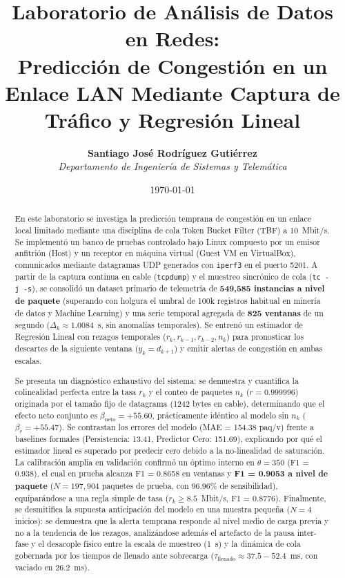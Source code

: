 \documentclass[11pt,a4paper]{article}
\title{\textbf{Laboratorio de Análisis de Datos en Redes: \\ Predicción de Congestión en un Enlace LAN Mediante Captura de Tráfico y Regresión Lineal}}
\author{\textbf{Santiago José Rodríguez Gutiérrez} \\ \textit{Departamento de Ingeniería de Sistemas y Telemática}}
\date{\today}
\begin{document}
\maketitle

\begin{abstract}
En este laboratorio se investiga la predicción temprana de congestión en un enlace local limitado mediante una disciplina de cola Token Bucket Filter (TBF) a 10~Mbit/s. Se implementó un banco de pruebas controlado bajo Linux compuesto por un emisor anfitrión (Host) y un receptor en máquina virtual (Guest VM en VirtualBox), comunicados mediante datagramas UDP generados con \texttt{iperf3} en el puerto 5201. A partir de la captura continua en cable (\texttt{tcpdump}) y el muestreo sincrónico de cola (\texttt{tc -j -s}), se consolidó un dataset primario de telemetría de \textbf{549,585 instancias a nivel de paquete} (superando con holgura el umbral de 100k registros habitual en minería de datos y Machine Learning) y una serie temporal agregada de \textbf{825 ventanas} de un segundo ($\Delta_k \approx 1.0084$~s, sin anomalías temporales). Se entrenó un estimador de Regresión Lineal con rezagos temporales ($r_k, r_{k-1}, r_{k-2}, n_k$) para pronosticar los descartes de la siguiente ventana ($y_k = d_{k+1}$) y emitir alertas de congestión en ambas escalas.

Se presenta un diagnóstico exhaustivo del sistema: se demuestra y cuantifica la colinealidad perfecta entre la tasa $r_k$ y el conteo de paquetes $n_k$ ($r = 0.999996$) originada por el tamaño fijo de datagrama (1242 bytes en cable), determinando que el efecto neto conjunto es $\beta_{\text{neto}} = +55.60$, prácticamente idéntico al modelo sin $n_k$ ($\beta_r = +55.47$). Se contrastan los errores del modelo (MAE = 154.38 paq/v) frente a baselines formales (Persistencia: 13.41, Predictor Cero: 151.69), explicando por qué el estimador lineal es superado por predecir cero debido a la no-linealidad de saturación. La calibración amplia en validación confirmó un óptimo interno en $\theta = 350$ (F1 = 0.938), el cual en prueba alcanza F1 = 0.8658 en ventanas y \textbf{F1 = 0.9053 a nivel de paquete} ($N = 197,904$ paquetes de prueba, con 96.96\% de sensibilidad), equiparándose a una regla simple de tasa ($r_k \ge 8.5$~Mbit/s, F1 = 0.8776). Finalmente, se desmitifica la supuesta anticipación del modelo en una muestra pequeña ($N=4$ inicios): se demuestra que la alerta temprana responde al nivel medio de carga previa y no a la tendencia de los rezagos, analizándose además el artefacto de la pausa inter-fase y el desacople físico entre la escala de muestreo (1~s) y la dinámica de cola gobernada por los tiempos de llenado ante sobrecarga ($\tau_{\text{llenado}} \approx 37.5 - 52.4$~ms, con vaciado en 26.2~ms).
\end{abstract}
\end{document}
